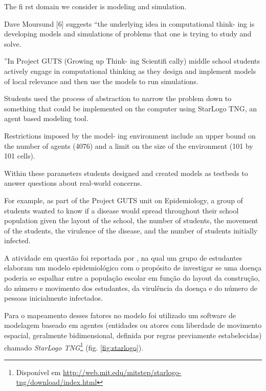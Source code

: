 The fi rst domain we consider is modeling and simulation.

Dave Moursund [6] suggests “the underlying idea in computational think- ing is developing models and simulations of problems that one is trying to study and solve.

”In Project GUTS (Growing up Think- ing Scientifi cally) middle school students actively engage in computational thinking as they design and implement models of local relevance and then use the models to run simulations.

Students used the process of abstraction to narrow the problem down to something that could be implemented on the computer using StarLogo TNG, an agent based modeling tool.

Restrictions imposed by the model- ing environment include an upper bound on the number of agents (4076) and a limit on the size of the environment (101 by 101 cells).

Within these parameters students designed and created models as testbeds to answer questions about real-world concerns.

For example, as part of the Project GUTS unit on Epidemiology, a group of students wanted to know if a disease would spread throughout their school population given the layout of the school, the number of students, the movement of the students, the virulence of the disease, and the number of students initially infected.


A atividade em questão foi reportada por , na qual um grupo de estudantes elaboram um modelo epidemiológico com o propósito de investigar se uma doença poderia se espalhar entre a população escolar em função do layout da construção, do número e movimento dos estudantes, da virulência da doença e do número de pessoas inicialmente infectados.
 
Para o mapeamento desses fatores no modelo foi utilizado um software de modelagem baseado em agentes (entidades ou atores com liberdade de movimento espacial, geralmente bidimensional, definida por regras previamente estabelecidas) chamado \textit{StarLogo TNG}\footnote{Disponível em \href{http://web.mit.edu/mitstep/starlogo-tng/download/index.html}{http://web.mit.edu/mitstep/starlogo-tng/download/index.html}} (fig. \ref{fig:starlogo}).

